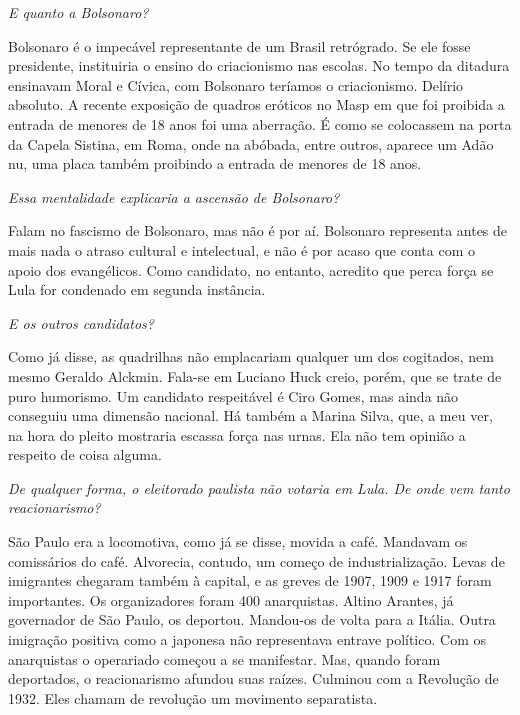 \itshape
 E quanto a Bolsonaro?

\normalfont
Bolsonaro é o impecável representante de um Brasil
retrógrado. Se ele fosse presidente, instituiria o ensino do
criacionismo nas escolas. No tempo da ditadura ensinavam Moral e Cívica,
com Bolsonaro teríamos o criacionismo. Delírio absoluto. A recente
exposição de quadros eróticos no Masp em que foi proibida a entrada de
menores de 18 anos foi uma aberração. É como se colocassem na porta da
Capela Sistina, em Roma, onde na abóbada, entre outros, aparece um Adão
nu, uma placa também proibindo a entrada de menores de 18 anos.

\itshape
 Essa mentalidade explicaria a ascensão de Bolsonaro?

\normalfont
Falam no fascismo de Bolsonaro, mas não é por aí.
Bolsonaro representa antes de mais nada o atraso cultural e intelectual,
e não é por acaso que conta com o apoio dos evangélicos. Como candidato,
no entanto, acredito que perca força se Lula for condenado em segunda
instância.

\itshape
 E os outros candidatos?

\normalfont
Como já disse, as quadrilhas não emplacariam qualquer um
dos cogitados, nem mesmo Geraldo Alckmin. Fala-se em Luciano Huck creio,
porém, que se trate de puro humorismo. Um candidato respeitável é Ciro
Gomes, mas ainda não conseguiu uma dimensão nacional. Há também a Marina
Silva, que, a meu ver, na hora do pleito mostraria escassa força nas
urnas. Ela não tem opinião a respeito de coisa alguma.

\itshape
 De qualquer forma, o eleitorado paulista não votaria em
Lula. De onde vem tanto reacionarismo?

\normalfont
São Paulo era a locomotiva, como já se disse, movida a
café. Mandavam os comissários do café. Alvorecia, contudo, um começo de
industrialização. Levas de imigrantes chegaram também à capital, e as
greves de 1907, 1909 e 1917 foram importantes. Os organizadores foram
400 anarquistas. Altino Arantes, já governador de São Paulo, os
deportou. Mandou-os de volta para a Itália. Outra imigração positiva
como a japonesa não representava entrave político. Com os anarquistas o
operariado começou a se manifestar. Mas, quando foram deportados, o
reacionarismo afundou suas raízes. Culminou com a Revolução de 1932.
Eles chamam de revolução um movimento separatista.

